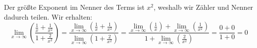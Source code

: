 \documentclass[main.tex]{subfiles}
\begin{document}
Der größte Exponent im Nenner des Terms ist $x^{2}$, weshalb wir Zähler und Nenner dadurch teilen. Wir erhalten:
\begin{equation*}
    \lim\limits _{x\rightarrow \infty }\left(\frac{\frac{1}{x} +\frac{1}{x^{2}}}{1+\frac{2}{x^{2}}}\right) =\frac{\lim\limits _{x\rightarrow \infty }\left(\frac{1}{x} +\frac{1}{x^{2}}\right)}{\lim\limits _{x\rightarrow \infty }\left( 1+\frac{2}{x^{2}}\right)} =\frac{\lim\limits _{x\rightarrow \infty }\left(\frac{1}{x}\right) +\lim\limits _{x\rightarrow \infty }\left(\frac{1}{x^{2}}\right)}{1+\lim\limits _{x\rightarrow \infty }\left(\frac{2}{x^{2}}\right)} =\frac{0+0}{1+0} =0
\end{equation*}
\end{document}
